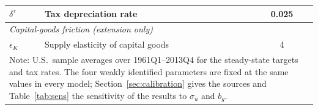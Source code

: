 \begin{table}[ht]
\begin{tabular}{llc}
$\delta^{\tau}$ & Tax depreciation rate & 0.025 \\
\hline
\multicolumn{3}{l}{\textit{Capital-goods friction (extension only)}} \\
$\epsilon_K$ & Supply elasticity of capital goods & 4 \\
\hline\hline
\multicolumn{3}{p{0.75\textwidth}}{\footnotesize Note: U.S.\ sample averages over 1961Q1--2013Q4 for the steady-state targets and tax rates. The four weakly identified parameters are fixed at the same values in every model; Section~\ref{sec:calibration} gives the sources and Table~\ref{tab:sens} the sensitivity of the results to $\sigma_u$ and $b_g$.}
\end{tabular}
\end{table}
